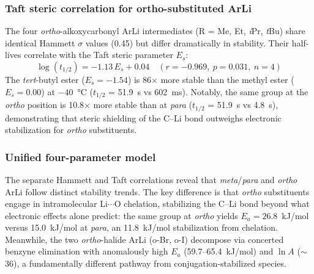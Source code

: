 \documentclass[journal=jcisd8,manuscript=article]{achemso}
\begin{document}
\subsubsection{Taft steric correlation for ortho-substituted ArLi}

The four \textit{ortho}-alkoxycarbonyl ArLi intermediates (R = Me, Et, \textit{i}Pr, \textit{t}Bu) share identical Hammett $\sigma$ values (0.45) but differ dramatically in stability.
Their half-lives correlate with the Taft steric parameter $E_s$:
\begin{equation}\label{eq:taft}
\log(t_{1/2}) = -1.13\,E_s + 0.04 \quad (r = -0.969,\ p = 0.031,\ n = 4)
\end{equation}
The \textit{tert}-butyl ester ($E_s = -1.54$) is 86$\times$ more stable than the methyl ester ($E_s = 0.00$) at $-40$~\si{\celsius} ($t_{1/2}$ = 51.9~s vs 602~ms).
Notably, the same  group at the \textit{ortho} position is 10.8$\times$ more stable than at \textit{para} ($t_{1/2}$ = 51.9~s vs 4.8~s), demonstrating that steric shielding of the C--Li bond outweighs electronic stabilization for \textit{ortho} substituents.

\subsubsection{Unified four-parameter model}

The separate Hammett and Taft correlations reveal that \textit{meta}/\textit{para} and \textit{ortho} ArLi follow distinct stability trends.
The key difference is that \textit{ortho} substituents engage in intramolecular Li$\cdots$O chelation, stabilizing the C--Li bond beyond what electronic effects alone predict: the same  group at \textit{ortho} yields $E_a = 26.8$~kJ/mol versus 15.0~kJ/mol at \textit{para}, an 11.8~kJ/mol stabilization from chelation.
Meanwhile, the two \textit{ortho}-halide ArLi (o-Br, o-I) decompose via concerted benzyne elimination with anomalously high $E_a$ (59.7--65.4~kJ/mol) and $\ln A$ ($\sim$36), a fundamentally different pathway from conjugation-stabilized species.
\end{document}
